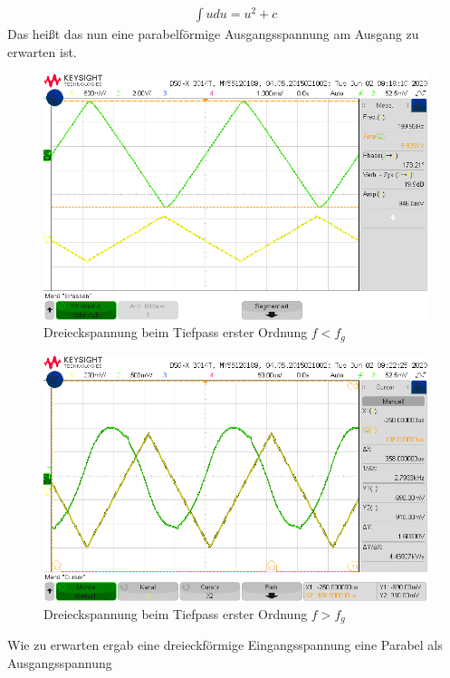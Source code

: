 \begin{align}
    \int{u du} = u^2 + c
\end{align}
Das heißt das nun eine parabelförmige Ausgangsspannung am Ausgang zu erwarten ist.

\begin{figure}[H]
    \centering
    \includegraphics[width=\costumPicWidth]{Lab_2/Messungen/TP_first_order/scope_30.png}
    \caption{Dreieckspannung beim Tiefpass erster Ordnung $f < f_g$}
    \label{fig:Dreieck_Tiefpass_erster_Ordnung_small_f}
\end{figure}
\begin{figure}[H]
    \centering
    \includegraphics[width=\costumPicWidth]{Lab_2/Messungen/TP_first_order/scope_34.png}
    \caption{Dreieckspannung beim Tiefpass erster Ordnung $f > f_g$}
    \label{fig:Dreieck_Tiefpass_erster_Ordnung_big_f}
\end{figure}
Wie zu erwarten ergab eine dreieckförmige Eingangsspannung eine Parabel als Ausgangsspannung
